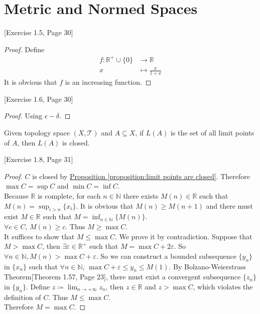 \chapter{Metric and Normed Spaces}

\begin{exercise}
{[Exercise 1.5, Page 30]}
\end{exercise}

\begin{proof}
Define 
	\begin{align*}
        f \colon \mathbb{R}^{+} \cup \{0\} &\to \mathbb{R}\\
        x &\mapsto \frac{x}{1 + x}
	\end{align*}
It is obvious that $f$ is an increasing function. 
\end{proof}

\begin{exercise}
{[Exercise 1.6, Page 30]}
\end{exercise}

\begin{proof}
Using $\epsilon - \delta$. 
\end{proof}

\begin{proposition}
\label{proposition:limit points are closed}
Given topology space $(X, \mathcal{T})$ and $A \subseteq X$, if $L(A)$ is the set of all limit points of $A$, then $L(A)$ is closed.  
\end{proposition}

\begin{exercise}
{[Exercise 1.8, Page 31]}
\end{exercise}

\begin{proof}
$C$ is closed by 
\hyperref[proposition:limit points are closed]{Proposition \ref*{proposition:limit points are closed}}. 
Therefore $\max C = \sup C$ and $\min C = \inf C$. \\
Because $\mathbb{R}$ is complete, for each $n \in \mathbb{N}$ there exists $M(n) \in \mathbb{R}$ such that $M(n) = \sup_{i > n} \{x_{i}\}$. It is obvious that $M(n) \geq M(n+1)$ and there must exist $M \in \mathbb{R}$ such that $M = \inf_{n \in \mathbb{N}} \{M(n)\}$. \\
$\forall c \in C$, $M(n) \geq c$. Thus $M \geq \max C$. \\
It suffices to show that $M \leq \max C$. We prove it by contradiction. Suppose that $M > \max C$, then $\exists \varepsilon \in \mathbb{R}^{+}$ such that $M = \max C + 2\varepsilon$. So $\forall n \in \mathbb{N}, M(n) > \max C + \varepsilon$. So we can construct a bounded subsequence $\{y_{n}\}$ in $\{x_n\}$ such that $\forall n \in \mathbb{N}$, $\max C + \varepsilon \leq y_n \leq M(1)$. By Bolzano-Weierstrass Theorem{[Theorem 1.57, Page 23]}, there must exist a convergent subsequence $\{z_n\}$ in $\{y_n\}$. Define $z \coloneqq \lim_{n \to +\infty} z_{n}$, then $z \in \mathbb{R}$ and $z > \max C$, which violates the definition of $C$. Thus $M \leq \max C$. \\
Therefore $M = \max C$. 
\end{proof}

